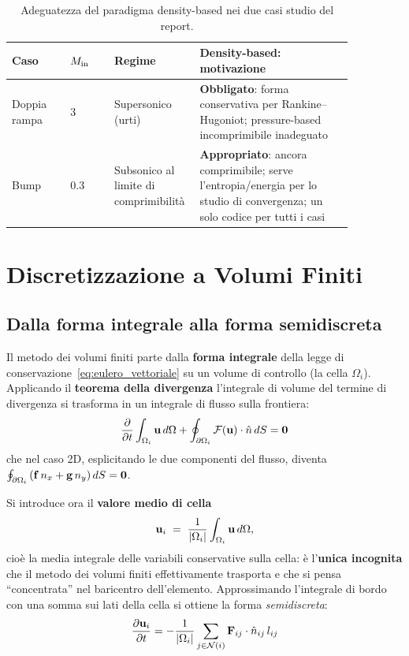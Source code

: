 \begin{table}[H]
\centering
\caption{Adeguatezza del paradigma density-based nei due casi studio del report.}
\label{tab:paradigma_casi}
\renewcommand{\arraystretch}{1.3}
\begin{tabular}{p{0.16\linewidth} p{0.12\linewidth} p{0.16\linewidth} p{0.42\linewidth}}
\toprule
\textbf{Caso} & \textbf{$M_{\rm in}$} & \textbf{Regime} & \textbf{Density-based: motivazione} \\
\midrule
Doppia rampa & $3$ & Supersonico (urti) & \textbf{Obbligato}: forma conservativa per Rankine--Hugoniot; pressure-based incomprimibile inadeguato \\
Bump & $0.3$ & Subsonico al limite di comprimibilità & \textbf{Appropriato}: ancora comprimibile; serve l'entropia/energia per lo studio di convergenza; un solo codice per tutti i casi \\
\bottomrule
\end{tabular}
\end{table}

\section{Discretizzazione a Volumi Finiti}

\subsection{Dalla forma integrale alla forma semidiscreta}

Il metodo dei volumi finiti parte dalla \textbf{forma integrale} della legge di
conservazione~\eqref{eq:eulero_vettoriale} su un volume di controllo (la cella
$\Omega_i$). Applicando il \textbf{teorema della divergenza} l'integrale di volume del
termine di divergenza si trasforma in un integrale di flusso sulla frontiera:
\begin{equation}
  \dfrac{\partial }{\partial t} \int_{\Omega_i} \mathbf{u} \, d\Omega
  + \oint_{\partial\Omega_i} \mathcal{F}(\mathbf{u})\cdot\hat{n} \, dS = \bm{0}
\end{equation}
che nel caso 2D, esplicitando le due componenti del flusso, diventa
$\oint_{\partial\Omega_i}\left(\mathbf{f}\,n_x + \mathbf{g}\,n_y\right) dS = \bm{0}$.

Si introduce ora il \textbf{valore medio di cella}
\begin{equation}
  \mathbf{u}_i \;=\; \frac{1}{|\Omega_i|}\int_{\Omega_i}\mathbf{u}\,d\Omega ,
\end{equation}
cioè la media integrale delle variabili conservative sulla cella: è l'\textbf{unica
incognita} che il metodo dei volumi finiti effettivamente trasporta e che si pensa
``concentrata'' nel baricentro dell'elemento. Approssimando l'integrale di bordo con
una somma sui lati della cella si ottiene la forma \emph{semidiscreta}:
\begin{equation}
  \dfrac{\partial \mathbf{u}_i}{\partial t} = -\frac{1}{|\Omega_i|}
  \sum_{j \in \mathcal{N}(i)} \mathbf{F}_{ij} \cdot \hat{n}_{ij} \, l_{ij}
  \label{eq:volumi_finiti}
\end{equation}

